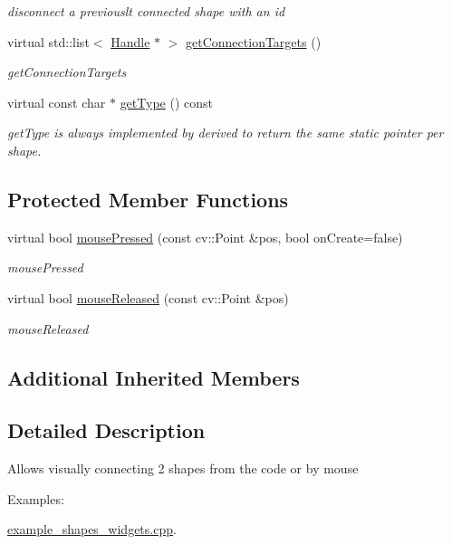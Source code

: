 \begin{DoxyCompactItemize}
\begin{DoxyCompactList}\small\item\em disconnect a previouslt connected shape with an \textquotesingle{}id\textquotesingle{} \end{DoxyCompactList}\item 
virtual std\+::list$<$ \hyperlink{classcanvascv_1_1Handle}{Handle} $\ast$ $>$ \hyperlink{classcanvascv_1_1ShapesConnector_a90672acd22f69f3d143f08197d4108b8}{get\+Connection\+Targets} ()
\begin{DoxyCompactList}\small\item\em get\+Connection\+Targets \end{DoxyCompactList}\item 
virtual const char $\ast$ \hyperlink{classcanvascv_1_1ShapesConnector_aedda9e8fd9c1be85704f289df94905a2}{get\+Type} () const 
\begin{DoxyCompactList}\small\item\em get\+Type is always implemented by derived to return the same static pointer per shape. \end{DoxyCompactList}\end{DoxyCompactItemize}
\subsection*{Protected Member Functions}
\begin{DoxyCompactItemize}
\item 
virtual bool \hyperlink{classcanvascv_1_1ShapesConnector_a6c6400403c6c2809af1e0a64e477f592}{mouse\+Pressed} (const cv\+::\+Point \&pos, bool on\+Create=false)
\begin{DoxyCompactList}\small\item\em mouse\+Pressed \end{DoxyCompactList}\item 
virtual bool \hyperlink{classcanvascv_1_1ShapesConnector_a56ab827f3d72e495ccfd1101807413f8}{mouse\+Released} (const cv\+::\+Point \&pos)
\begin{DoxyCompactList}\small\item\em mouse\+Released \end{DoxyCompactList}\end{DoxyCompactItemize}
\subsection*{Additional Inherited Members}


\subsection{Detailed Description}
Allows visually connecting 2 shapes from the code or by mouse \begin{Desc}
\item[Examples\+: ]\par
\hyperlink{example_shapes_widgets_8cpp-example}{example\+\_\+shapes\+\_\+widgets.\+cpp}.\end{Desc}


